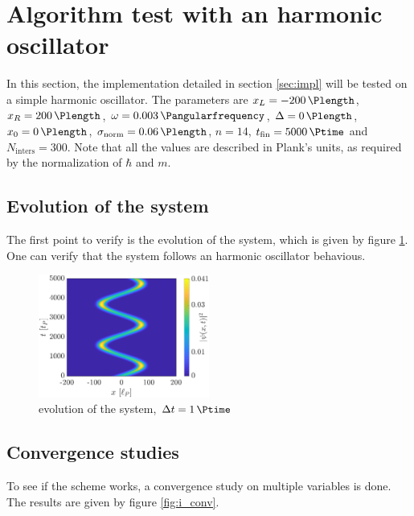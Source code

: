 \documentclass[a4paper,12pt,twoside]{article}
\begin{document}


\newpage
\section{Algorithm test with an harmonic oscillator}\label{sec:har_osc}
  In this section, the implementation detailed in section \ref{sec:impl} will be tested on a simple harmonic oscillator.
  The parameters are $x_L=\SI{-200}{\Plength}$, $x_R=\SI{200}{\Plength}$, $\omega = \SI{0.003}{\Pangularfrequency}$, $\Delta = \SI{0}{\Plength}$, $x_0 = \SI{0}{\Plength}$, $\sigma_\text{norm} = \SI{0.06}{\Plength}$, $n=14$, $t_\text{fin} = \SI{5000}{\Ptime}$ and $N_\text{inters} = 300$.
  Note that all the values are described in Plank's units, as required by the normalization of $\hbar$ and $m$.


  \subsection{Evolution of the system}
  The first point to verify is the evolution of the system, which is given by figure \ref{fig:i_evo}.
  One can verify that the system follows an harmonic oscillator behavious.

  \begin{figure}[h]
    \centering
    \includegraphics[width=0.5\textwidth]{graphs/i_evo.eps}
    \caption{evolution of the system, $\Delta t = \SI{1}{\Ptime}$}
    \label{fig:i_evo}
  \end{figure}

  \subsection{Convergence studies}
    To see if the scheme works, a convergence study on multiple variables is done.
    The results are given by figure \ref{fig:i_conv}.
\end{document}
